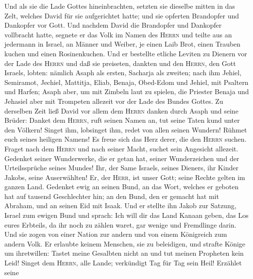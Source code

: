  Und als sie die Lade Gottes hineinbrachten, setzten sie
dieselbe mitten in das Zelt, welches David für sie aufgerichtet hatte;
und sie opferten Brandopfer und Dankopfer vor Gott.  Und
nachdem David die Brandopfer und Dankopfer vollbracht hatte, segnete er
das Volk im Namen des \textsc{Herrn}  und teilte aus an
jedermann in Israel, an Männer und Weiber, je einen Laib Brot, einen
Trauben kuchen und einen Rosinenkuchen.  Und er bestellte
etliche Leviten zu Dienern vor der Lade des \textsc{Herrn} und daß sie
preiseten, dankten und den \textsc{Herrn}, den Gott Israels, lobten:
 nämlich Asaph als ersten, Sacharja als zweiten; nach ihm
Jehiel, Semiramot, Jechiel, Mattitja, Eliab, Benaja, Obed-Edom und
Jehiel, mit Psaltern und Harfen; Asaph aber, um mit Zimbeln laut zu
spielen,  die Priester Benaja und Jehasiel aber mit
Trompeten allezeit vor der Lade des Bundes Gottes.  Zu
derselben Zeit ließ David vor allem dem \textsc{Herrn} danken durch
Asaph und seine Brüder:  Danket dem \textsc{Herrn}, ruft
seinen Namen an, tut seine Taten kund unter den Völkern! 
Singet ihm, lobsinget ihm, redet von allen seinen Wundern!
 Rühmet euch seines heiligen Namens! Es freue sich das
Herz derer, die den \textsc{Herrn} suchen.  Fraget nach
dem \textsc{Herrn} und nach seiner Macht, suchet sein Angesicht
allezeit.  Gedenket seiner Wunderwerke, die er getan hat,
seiner Wunderzeichen und der Urteilssprüche seines Mundes!
 Ihr, der Same Israels, seines Dieners, ihr Kinder
Jakobs, seine Auserwählten!  Er, der \textsc{Herr}, ist
unser Gott; seine Rechte gelten im ganzen Land.  Gedenket
ewig an seinen Bund, an das Wort, welches er geboten hat auf tausend
Geschlechter hin;  an den Bund, den er gemacht hat mit
Abraham, und an seinen Eid mit Isaak.  Und er stellte ihn
Jakob zur Satzung, Israel zum ewigen Bund und sprach: 
Ich will dir das Land Kanaan geben, das Los eures Erbteils,
 da ihr noch zu zählen waret, gar wenige und Fremdlinge
darin.  Und sie zogen von einer Nation zur andern und von
einem Königreich zum andern Volk.  Er erlaubte keinem
Menschen, sie zu beleidigen, und strafte Könige um ihretwillen:
 Tastet meine Gesalbten nicht an und tut meinen Propheten
kein Leid!  Singet dem \textsc{Herrn}, alle Lande;
verkündigt Tag für Tag sein Heil!  Erzählet seine
